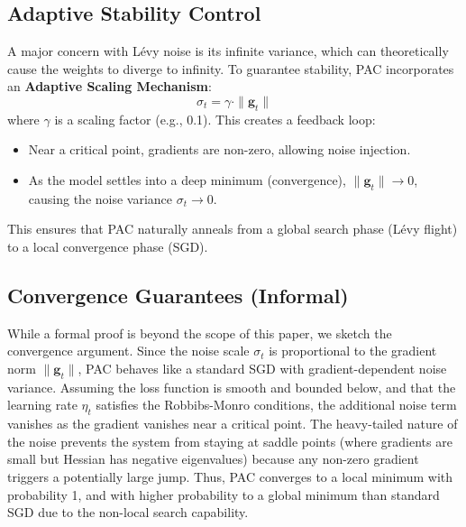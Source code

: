 \documentclass{article}
\theoremstyle{plain}
\theoremstyle{definition}
\theoremstyle{remark}
\newcommand{\gvec}{\mathbf{g}}
\begin{document}
\subsection{Adaptive Stability Control}
A major concern with Lévy noise is its infinite variance, which can theoretically cause the weights to diverge to infinity. To guarantee stability, PAC incorporates an \textbf{Adaptive Scaling Mechanism}:
\begin{equation}
    \sigma_t = \gamma \cdot \| \gvec_t \|
\end{equation}
where $\gamma$ is a scaling factor (e.g., 0.1). This creates a feedback loop:
\begin{itemize}
    \item Near a critical point, gradients are non-zero, allowing noise injection.
    \item As the model settles into a deep minimum (convergence), $\| \gvec_t \| \to 0$, causing the noise variance $\sigma_t \to 0$.
\end{itemize}
This ensures that PAC naturally anneals from a global search phase (Lévy flight) to a local convergence phase (SGD).

\subsection{Convergence Guarantees (Informal)}
While a formal proof is beyond the scope of this paper, we sketch the convergence argument. Since the noise scale $\sigma_t$ is proportional to the gradient norm $\|\gvec_t\|$, PAC behaves like a standard SGD with gradient-dependent noise variance.
Assuming the loss function is smooth and bounded below, and that the learning rate $\eta_t$ satisfies the Robbibs-Monro conditions, the additional noise term vanishes as the gradient vanishes near a critical point. The heavy-tailed nature of the noise prevents the system from staying at saddle points (where gradients are small but Hessian has negative eigenvalues) because any non-zero gradient triggers a potentially large jump. Thus, PAC converges to a local minimum with probability 1, and with higher probability to a global minimum than standard SGD due to the non-local search capability.
\end{document}
